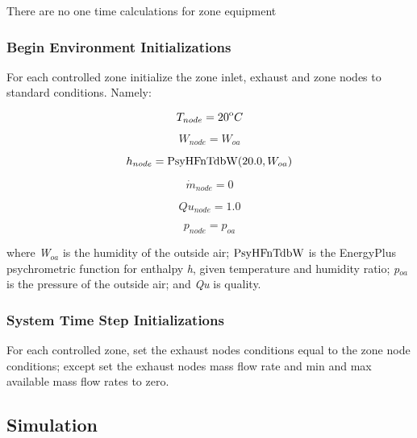 There are no one time calculations for zone equipment

\subsubsection{Begin Environment Initializations}\label{begin-environment-initializations-000}

For each controlled zone initialize the zone inlet, exhaust and zone nodes to standard conditions. Namely:

\begin{equation}
{T_{node}} = {20^{\rm{o}}}C
\end{equation}

\begin{equation}
{W_{node}} = {W_{oa}}
\end{equation}

\begin{equation}
{h_{node}} = {\mathop{\rm PsyHFnTdbW}\nolimits} {\rm{(}}20.0,{W_{oa}}{\rm{)}}
\end{equation}

\begin{equation}
{\dot m_{node}} = 0
\end{equation}

\begin{equation}
Q{u_{node}} = 1.0
\end{equation}

\begin{equation}
{p_{node}} = {p_{oa}}
\end{equation}

where \emph{W\(_{oa}\)} is the humidity of the outside air; \({\rm{PsyHFnTdbW}}\) is the EnergyPlus psychrometric function for enthalpy \emph{h}, given temperature and humidity ratio; \emph{p\(_{oa}\)} is the pressure of the outside air; and \emph{Qu} is quality.

\subsubsection{System Time Step Initializations}\label{system-time-step-initializations-000}

For each controlled zone, set the exhaust nodes conditions equal to the zone node conditions; except set the exhaust nodes mass flow rate and min and max available mass flow rates to zero.

\subsection{Simulation}\label{simulation-003}


